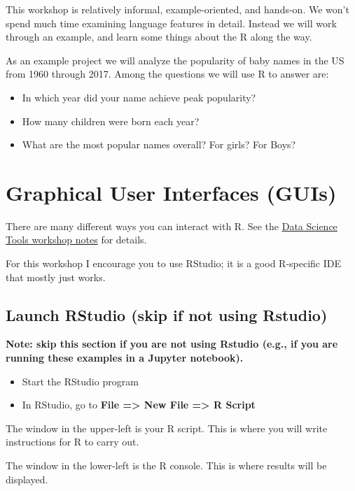 \documentclass[]{book}
\providecommand{\tightlist}{%
  \setlength{\itemsep}{0pt}\setlength{\parskip}{0pt}}
\begin{document}
This workshop is relatively informal, example-oriented, and hands-on. We
won't spend much time examining language features in detail. Instead we
will work through an example, and learn some things about the R along
the way.

As an example project we will analyze the popularity of baby names in
the US from 1960 through 2017. Among the questions we will use R to
answer are:

\begin{itemize}
\tightlist
\item
  In which year did your name achieve peak popularity?
\item
  How many children were born each year?
\item
  What are the most popular names overall? For girls? For Boys?
\end{itemize}

\chapter{Graphical User Interfaces
(GUIs)}\label{graphical-user-interfaces-guis}

There are many different ways you can interact with R. See the
\href{http://tutorials.iq.harvard.edu/DataScienceTools/DataScienceTools.html}{Data
Science Tools workshop notes} for details.

For this workshop I encourage you to use RStudio; it is a good
R-specific IDE that mostly just works.

\section{Launch RStudio (skip if not using
Rstudio)}\label{launch-rstudio-skip-if-not-using-rstudio}

\textbf{Note: skip this section if you are not using Rstudio (e.g., if
you are running these examples in a Jupyter notebook).}

\begin{itemize}
\tightlist
\item
  Start the RStudio program
\item
  In RStudio, go to \textbf{File =\textgreater{} New File
  =\textgreater{} R Script}
\end{itemize}

The window in the upper-left is your R script. This is where you will
write instructions for R to carry out.

The window in the lower-left is the R console. This is where results
will be displayed.
\end{document}
